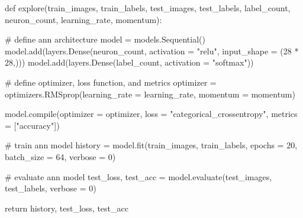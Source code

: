 \documentclass[
  letterpaper,
  DIV=11,
  numbers=noendperiod]{scrreprt}
\newenvironment{Shaded}{\begin{snugshade}}{\end{snugshade}}
\newcommand{\BuiltInTok}[1]{\textcolor[rgb]{0.00,0.23,0.31}{#1}}
\newcommand{\CommentTok}[1]{\textcolor[rgb]{0.37,0.37,0.37}{#1}}
\newcommand{\ControlFlowTok}[1]{\textcolor[rgb]{0.00,0.23,0.31}{#1}}
\newcommand{\DecValTok}[1]{\textcolor[rgb]{0.68,0.00,0.00}{#1}}
\newcommand{\KeywordTok}[1]{\textcolor[rgb]{0.00,0.23,0.31}{#1}}
\newcommand{\NormalTok}[1]{\textcolor[rgb]{0.00,0.23,0.31}{#1}}
\newcommand{\OperatorTok}[1]{\textcolor[rgb]{0.37,0.37,0.37}{#1}}
\newcommand{\StringTok}[1]{\textcolor[rgb]{0.13,0.47,0.30}{#1}}
\begin{document}
\begin{Shaded}
\begin{Highlighting}[]
\KeywordTok{def}\NormalTok{ explore(train\_images, }
\NormalTok{            train\_labels, }
\NormalTok{            test\_images, }
\NormalTok{            test\_labels,}
\NormalTok{            label\_count,}
\NormalTok{            neuron\_count,}
\NormalTok{            learning\_rate,}
\NormalTok{            momentum):}

    \CommentTok{\# define ann architecture}
\NormalTok{    model }\OperatorTok{=}\NormalTok{ models.Sequential()}
\NormalTok{    model.add(layers.Dense(neuron\_count, activation }\OperatorTok{=} \StringTok{"relu"}\NormalTok{, input\_shape }\OperatorTok{=}\NormalTok{ (}\DecValTok{28} \OperatorTok{*} \DecValTok{28}\NormalTok{,)))}
\NormalTok{    model.add(layers.Dense(label\_count, activation }\OperatorTok{=} \StringTok{"softmax"}\NormalTok{))}

    \CommentTok{\# define optimizer, loss function, and metrics}
\NormalTok{    optimizer }\OperatorTok{=}\NormalTok{ optimizers.RMSprop(learning\_rate }\OperatorTok{=}\NormalTok{ learning\_rate, momentum }\OperatorTok{=}\NormalTok{ momentum)}

\NormalTok{    model.}\BuiltInTok{compile}\NormalTok{(optimizer }\OperatorTok{=}\NormalTok{ optimizer,}
\NormalTok{                  loss }\OperatorTok{=} \StringTok{"categorical\_crossentropy"}\NormalTok{,}
\NormalTok{                  metrics }\OperatorTok{=}\NormalTok{ [}\StringTok{"accuracy"}\NormalTok{])}

    \CommentTok{\# train ann model}
\NormalTok{    history }\OperatorTok{=}\NormalTok{ model.fit(train\_images, train\_labels, epochs }\OperatorTok{=} \DecValTok{20}\NormalTok{, batch\_size }\OperatorTok{=} \DecValTok{64}\NormalTok{, verbose }\OperatorTok{=} \DecValTok{0}\NormalTok{)}

    \CommentTok{\# evaluate ann model}
\NormalTok{    test\_loss, test\_acc }\OperatorTok{=}\NormalTok{ model.evaluate(test\_images, test\_labels, verbose }\OperatorTok{=} \DecValTok{0}\NormalTok{)}

    \ControlFlowTok{return}\NormalTok{ history, test\_loss, test\_acc}
\end{Highlighting}
\end{Shaded}
\end{document}
